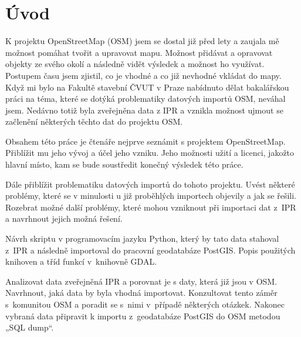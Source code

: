 \chapter{Úvod}
\label{1-uvod}



K projektu OpenStreetMap (OSM) jsem se dostal již před lety a zaujala mě možnost pomáhat tvořit 
a upravovat mapu. Možnost přidávat a opravovat objekty ze svého okolí a následně 
vidět výsledek a možnost ho využívat. Postupem času jsem zjistil, co je vhodné a 
co již nevhodné vkládat do mapy. Když mi bylo na Fakultě stavební ČVUT v Praze nabídnuto dělat 
bakalářskou práci na téma, které se dotýká problematiky datových importů OSM,
neváhal jsem. Nedávno totiž byla zveřejněna data z IPR a vznikla možnost ujmout 
se začlenění některých těchto dat do projektu OSM. 

Obsahem této práce je čtenáře nejprve seznámit s projektem OpenStreetMap. 
Přiblížit mu jeho vývoj a účel jeho vzniku. Jeho možnosti užití a licenci, 
jakožto hlavní místo, kam se bude soustředit konečný výsledek této práce.

Dále přiblížit problematiku datových importů do tohoto projektu. Uvést některé
problémy, které se v minulosti u již proběhlých importech objevily a jak se 
řešili. Rozebrat možné další problémy, které mohou vzniknout při importaci dat 
z~IPR a navrhnout jejich možná řešení. 

Návrh skriptu v programovacím jazyku Python, který by tato data stahoval z~IPR 
a následně importoval do pracovní geodatabáze PostGIS. Popis použitých knihoven a 
tříd funkcí v~knihovně GDAL.

Analizovat data zveřejněná IPR a porovnat je s daty, která již jsou v OSM. 
Navrhnout, jaká data by byla vhodná importovat. Konzultovat tento záměr
s~komunitou OSM a poradit se s~nimi v~případě některých otázkek. Nakonec 
vybraná data připravit k importu z~geodatabáze PostGIS do OSM metodou „SQL dump“.
